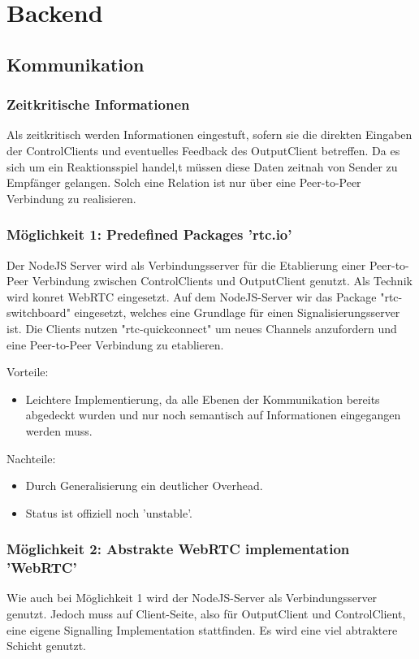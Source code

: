 \chapter{Backend}

\section{Kommunikation}

\subsection{Zeitkritische Informationen}
Als zeitkritisch werden Informationen eingestuft, sofern sie die direkten Eingaben der 
ControlClients und eventuelles Feedback des OutputClient betreffen. Da es sich um ein Reaktionsspiel handel,t müssen diese Daten zeitnah von Sender zu Empfänger gelangen. Solch eine Relation ist nur über eine Peer-to-Peer Verbindung zu realisieren.

\subsection{Möglichkeit 1: Predefined Packages 'rtc.io'}
Der NodeJS Server wird als Verbindungsserver für die Etablierung einer Peer-to-Peer Verbindung zwischen ControlClients und OutputClient genutzt. Als Technik wird konret WebRTC eingesetzt. Auf dem NodeJS-Server wir das Package "rtc-switchboard" eingesetzt, welches eine Grundlage für einen  Signalisierungsserver ist. Die Clients nutzen "rtc-quickconnect" um neues Channels anzufordern und eine Peer-to-Peer Verbindung zu etablieren.



Vorteile:
\begin{itemize}
\item
Leichtere Implementierung, da alle Ebenen der Kommunikation bereits abgedeckt wurden und nur noch semantisch auf Informationen eingegangen werden muss.
\end{itemize}

Nachteile:
\begin{itemize}
\item
Durch Generalisierung ein deutlicher Overhead.

\item
Status ist offiziell noch 'unstable'.
\end{itemize}

\subsection{Möglichkeit 2: Abstrakte WebRTC implementation 'WebRTC'}
Wie auch bei Möglichkeit 1 wird der NodeJS-Server als Verbindungsserver genutzt. Jedoch muss auf Client-Seite, also für OutputClient und ControlClient, eine eigene Signalling Implementation stattfinden. Es wird eine viel abtraktere Schicht genutzt.



